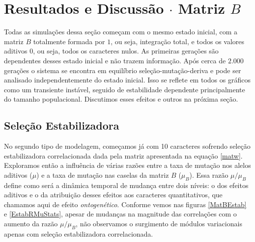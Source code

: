 \section{Resultados e Discussão $\cdot$ Matriz $B$}

Todas as simulações dessa seção começam com o mesmo estado inicial, com
a matriz $B$ totalmente formada por $1$, ou seja, integração total, e
todos os valores aditivos $0$, ou seja, todos os caracteres nulos. 
As primeiras gerações são dependentes desses estado inicial e não trazem
informação. 
Após cerca de $2.000$ gerações o sistema se encontra em equilíbrio
seleção-mutação-deriva e pode ser analisado independentemente do estado
inicial. 
Isso se reflete em todos os gráficos como um transiente instável, seguido
de estabilidade dependente principalmente do tamanho populacional.
Discutimos esses efeitos e outros na próxima seção. 

\subsection{Seleção Estabilizadora}

No segundo tipo de modelagem, começamos já com 10 caracteres sofrendo
seleção estabilizadora correlacionada dada pela matriz apresentada na
equação \ref{matw}. 
Exploramos então a influência de várias razões entre a taxa de mutação
nos alelos aditivos ($\mu$) e a taxa de mutação nas caselas da matriz
$B$ ($\mu_B$). 
Essa razão $\mu/\mu_B$ define como será a dinâmica temporal de mudança
entre dois níveis: o dos efeitos aditivos e o da atribuição desses
efeitos aos caracteres quantitativos, que chamamos aqui de efeito {\it ontogenético}. 
Conforme vemos nas figuras \ref{MatBEstab} e \ref{EstabRMuStats}, apesar de mudanças na
magnitude das correlações com o aumento da razão $\mu/\mu_B$, não
observamos o surgimento de módulos variacionais apenas com seleção
estabilizadora correlacionada. 


